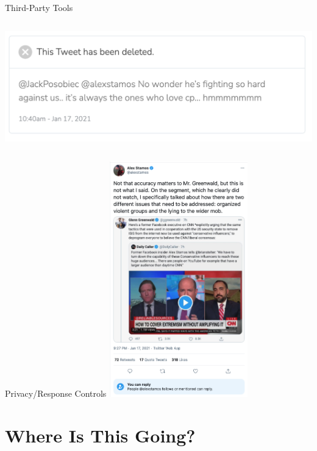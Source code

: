 \documentclass[nobackground,dvipsnames,table]{beamer}
\begin{document}
\begin{frame}{Third-Party Tools}
\begin{columns}
            \includegraphics[width=\textwidth]{deleted-harassment-tweet}
    \end{columns}
\end{frame}

\begin{frame}{Privacy/Response Controls}
    \centering
    \includegraphics[width=0.45\textwidth]{greenwald-tweets}
\end{frame}

\section{Where Is This Going?}
\end{document}
